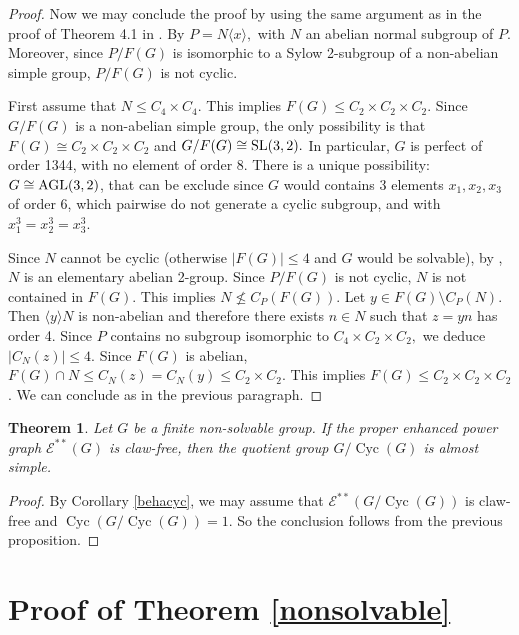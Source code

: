 \documentclass[preprint,11pt]{elsarticle}
\newcommand{\cyc}{\operatorname{Cyc}}
\newtheorem{theorem}{\bf Theorem}[section]
\begin{document}
\begin{proof}
Now we may conclude the proof by using the same argument as in the proof of Theorem 4.1 in \cite{claw-free-pwr-graph}. By  \cite[Proposition 2.8]{claw-free-pwr-graph} $P=N\langle x\rangle,$ with $N$ an abelian normal subgroup of $P.$ Moreover, since $P/F(G)$ is isomorphic to a Sylow 2-subgroup of a non-abelian simple group, $P/F(G)$ is not cyclic. 


First assume that $N\leq C_4\times C_4.$ This implies $F(G)\leq C_2\times C_2 \times C_2.$ Since $G/F(G)$ is a non-abelian simple group, the only possibility is that $F(G)\cong C_2\times C_2\times C_2$ and $G/F(G)\cong {\rm{SL}}(3,2).$ In particular, $G$ is perfect of order 1344, with no element of order 8. There is a unique possibility: $G\cong \rm{{AGL}}(3,2)$, that can be exclude since $G$ would contains 3 elements $x_1,x_2,x_3$ of order 6, which pairwise do not generate a cyclic subgroup, and with $x_1^3=x_2^3=x_3^3.$

Since $N$ cannot be cyclic (otherwise $|F(G)|\leq 4$ and $G$ would be solvable), by \cite[Corollary 2.4]{claw-free-pwr-graph}, $N$ is an elementary abelian 2-group. 
Since $P/F(G)$ is not cyclic, $N$ is not contained in $F(G).$ This implies  $N\not\leq C_P(F(G)).$ 
Let $y\in F(G)\setminus C_P(N).$ Then $\langle y\rangle N$ is non-abelian and therefore there exists $n\in N$ such that $z=yn$ has order 4. Since $P$ contains no subgroup isomorphic to $C_4\times C_2\times C_2,$ we deduce $|C_N(z)|\leq 4.$
Since $F(G)$ is abelian, $F(G)\cap N\leq C_N(z)=C_N(y)\leq C_2\times C_2$. This implies $F(G)\leq C_2\times C_2 \times C_2$. We can conclude as in the previous paragraph.
\end{proof}

\begin{theorem}\label{thm:almost-simple}
	Let $G$ be a finite non-solvable group. If the proper enhanced power graph $\mathcal{E}^{**}(G)$ is claw-free, then the quotient group $G/\cyc(G)$ is almost simple.
\end{theorem}


\begin{proof}
	By Corollary  \ref{behacyc}, we may assume that $\mathcal E^{**}(G/\cyc(G))$ is claw-free and $\cyc(G/\cyc(G))=1.$ So the conclusion follows from the previous proposition.
\end{proof}


\section{Proof of Theorem \ref{nonsolvable}}
\end{document}
